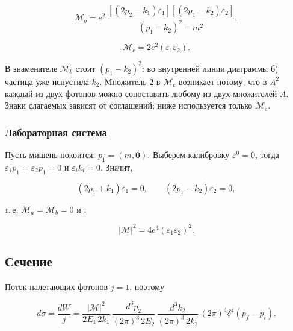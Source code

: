 \documentclass[../final.tex]{subfiles}
\begin{document}
\begin{equation*}
    \mathcal M_b
    =
    e^2\,
    \frac{
        \left[\left(2p_2-k_1\right)\varepsilon_1\right]
        \left[\left(2p_1-k_2\right)\varepsilon_2\right]
    }{
        \left(p_1-k_2\right)^2-m^2
    },
\end{equation*}

\begin{equation*}
    \mathcal M_c
    =
    2e^2\left(\varepsilon_1\varepsilon_2\right).
\end{equation*}

\remark
В знаменателе $\mathcal M_b$ стоит $(p_1-k_2)^2$: во внутренней
линии диаграммы б) частица уже испустила $k_2$.
Множитель $2$ в $\mathcal M_c$ возникает потому, что в $A^2$
каждый из двух фотонов можно сопоставить любому из двух
множителей $A$. Знаки слагаемых зависят от соглашений; ниже
используется только $\mathcal M_c$.

\subsubsection{Лабораторная система}

Пусть мишень покоится: $p_1=(m,\mathbf 0)$. Выберем калибровку
$\varepsilon^0=0$, тогда $\varepsilon_1p_1=\varepsilon_2p_1=0$ и
$\varepsilon_ik_i=0$. Значит,

\begin{equation*}
    \left(2p_1+k_1\right)\varepsilon_1=0,
    \qquad
    \left(2p_1-k_2\right)\varepsilon_2=0,
\end{equation*}

т.\,е. $\mathcal M_a=\mathcal M_b=0$ и
:

\begin{equation*}
    |\mathcal M|^2=4e^4\left(\varepsilon_1\varepsilon_2\right)^2.
\end{equation*}


\subsection{Сечение}

Поток налетающих фотонов $j=1$, поэтому

\begin{equation*}
    d\sigma
    =
    \frac{dW}{j}
    =
    \frac{|\mathcal M|^2}{2E_1\,2k_1}\,
    \frac{d^3p_2}{(2\pi)^3\,2E_2}\,
    \frac{d^3k_2}{(2\pi)^3\,2k_2}\,
    (2\pi)^4\delta^4(p_f-p_i).
\end{equation*}
\end{document}
